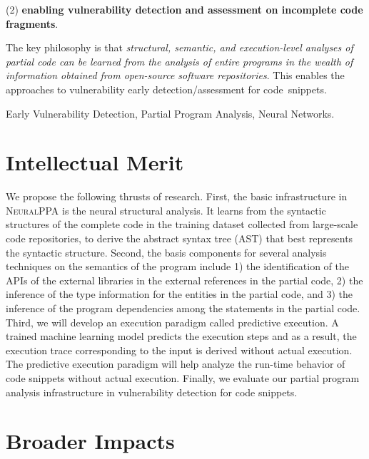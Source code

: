 \documentclass[11pt]{article}
\newcommand{\tool}{\textsc{NeuralPPA}\xspace}
\begin{document}
(2) {\bf enabling vulnerability detection and assessment on incomplete code fragments}.

The key philosophy is that {\em structural, semantic, and
  execution-level analyses of partial code can be learned from the
  analysis of entire programs in the wealth of information obtained
  from open-source software repositories}. This enables the approaches
to vulnerability early detection/assessment for code~snippets.


 Early Vulnerability Detection, Partial Program Analysis, Neural Networks.

\section{Intellectual Merit}


We propose the following thrusts of research. First, the basic
infrastructure in {\tool} is the neural structural analysis. It learns
from the syntactic structures of the complete code in the training
dataset collected from large-scale code repositories, to derive the
abstract syntax tree (AST) that best represents the syntactic
structure.
Second, the basis components for several analysis techniques on the
semantics of the program include 1) the identification of the APIs of
the external libraries in the external references in the partial code,
2) the inference of the type information for the entities in the
partial code, and 3) the inference of the program dependencies among
the statements in the partial code. Third, we will develop an
execution paradigm called predictive execution. A trained machine
learning model predicts the execution steps and as a result, the
execution trace corresponding to the input is derived without actual
execution. The predictive execution paradigm will help analyze the
run-time behavior of code snippets without actual execution. Finally,
we evaluate our partial program analysis infrastructure in
vulnerability detection for code snippets.




\section{Broader Impacts}
\end{document}

